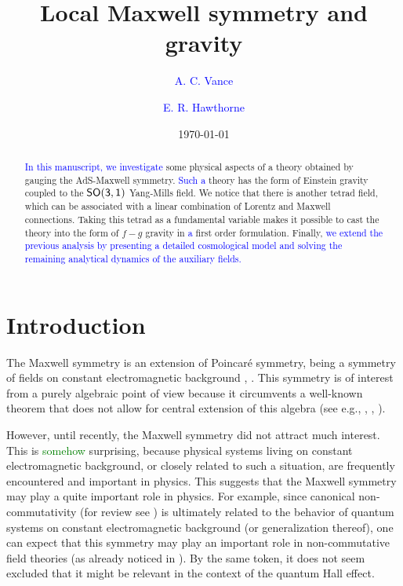 \documentclass [prd,reprint,eqsecnum,nofootinbib]  {revtex4-1}
\begin{document}
\title{%
Local Maxwell symmetry and gravity}
\author{\textcolor{blue}{A. C. Vance}}
\affiliation{\textcolor{blue}{Department of Theoretical Physics, Arkham State University, Miskatonic Valley, 02-100 Arkham, USA}}
\author{\textcolor{blue}{E. R. Hawthorne}}
\affiliation{\textcolor{blue}{Department of Theoretical Physics, Arkham State University, Miskatonic Valley, 02-100 Arkham, USA}}
\date{\today}

\begin{abstract}\noindent
\textcolor{blue}{In this manuscript, we investigate} some physical aspects of a theory obtained
by gauging the AdS-Maxwell symmetry. \textcolor{blue}{Such a} theory has the form of
Einstein gravity coupled to the $\sf{SO(3,1)}$ Yang-Mills field. We
notice that there is another tetrad field, which can be associated
with a linear combination of Lorentz and Maxwell connections. Taking
this tetrad as a fundamental variable makes it possible to cast the
theory into the form of $f-g$ gravity in \textcolor{blue}{a} first order formulation.
Finally, \textcolor{blue}{we extend the previous analysis by presenting a detailed cosmological model and solving the remaining analytical dynamics of the auxiliary fields.}
\end{abstract}
\maketitle

\section{Introduction}

The Maxwell symmetry is an extension of Poincar\'e symmetry, being a
symmetry of fields on constant electromagnetic background
\cite{Bacry:1970ye}, \cite{Schrader:1972zd}. This symmetry is of
interest from a purely algebraic point of view because it circumvents
a well-known theorem that does not allow for central extension of
this algebra (see e.g., \cite{Galindo:1967}, \cite{Soroka:2011tc},
\cite{Gomis:2009dm}).

However, until recently, the Maxwell symmetry did not attract much
interest. This is \textcolor{green}{somehow} surprising, because physical systems
living on constant electromagnetic background, or closely related to such a
situation, are frequently encountered and important in
physics. This suggests that the Maxwell symmetry may play a quite
important role in physics. For example, since canonical
non-commutativity (for review see \cite{Douglas:2001ba}) is
ultimately related to the behavior of quantum systems on constant
electromagnetic background (or generalization thereof), one can
expect that this symmetry may play an important role in
non-commutative field theories (as already noticed in
\cite{Doplicher:1994tu}). By the same token, it does not seem
excluded that it might be relevant in the context of the quantum Hall
effect.
\end{document}
